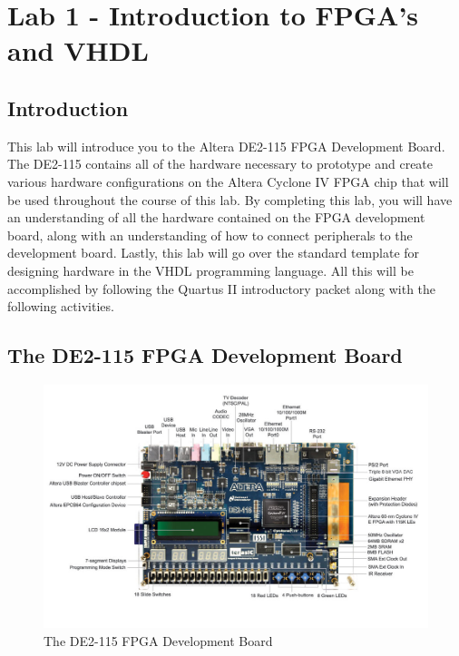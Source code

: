 \section{Lab 1 - Introduction to FPGA's and VHDL}

\subsection{Introduction}
This lab will introduce you to the Altera DE2-115 FPGA Development Board. The DE2-115 contains all of the hardware necessary to prototype and create various hardware configurations on the Altera Cyclone IV FPGA chip that will be used throughout the course of this lab. By completing this lab, you will have an understanding of all the hardware contained on the FPGA development board, along with an understanding of how to connect peripherals to the development board. Lastly, this lab will go over the standard template for designing hardware in the VHDL programming language. All this will be accomplished by following the Quartus II introductory packet along with the following activities.

\subsection{The DE2-115 FPGA Development Board}

\begin{figure}[H]
	\centering
	\includegraphics[width=170mm]{Lab1/figures/DE2-115.jpg}
	\caption{The DE2-115 FPGA Development Board}
	\label{fig:DE2-115}
\end{figure}

